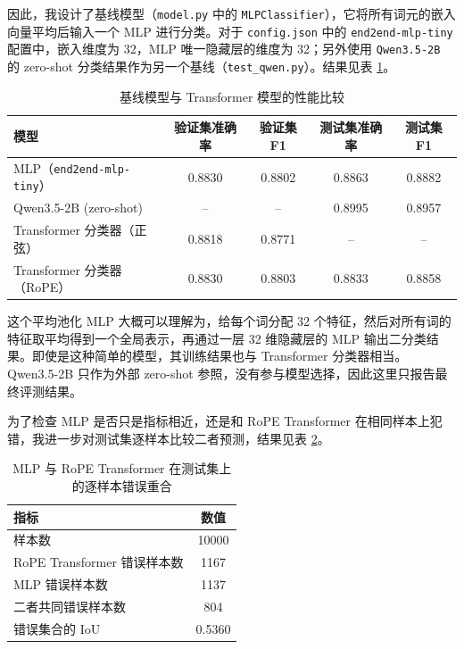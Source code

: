 \documentclass{ctexart}
\begin{document}
因此，我设计了基线模型（\verb|model.py| 中的 \verb|MLPClassifier|），它将所有词元的嵌入向量平均后输入一个 MLP 进行分类。对于 \verb|config.json| 中的 \verb|end2end-mlp-tiny| 配置中，嵌入维度为 32，MLP 唯一隐藏层的维度为 32；另外使用 \verb|Qwen3.5-2B| 的 zero-shot 分类结果作为另一个基线（\verb|test_qwen.py|）。结果见表 \ref{tab:baseline-results}。

\begin{table}[htbp]
    \centering
    \begin{tabular}{lcccc}
        \toprule
        模型 & 验证集准确率 & 验证集 F1 & 测试集准确率 & 测试集 F1 \\
        \midrule
        MLP（\verb|end2end-mlp-tiny|） & 0.8830 & 0.8802 & 0.8863 & 0.8882 \\
        Qwen3.5-2B (zero-shot) & -- & -- & 0.8995 & 0.8957 \\
        Transformer 分类器（正弦） & 0.8818 & 0.8771 & -- & -- \\
        Transformer 分类器（RoPE） & 0.8830 & 0.8803 & 0.8833 & 0.8858 \\
        \bottomrule
    \end{tabular}
    \caption{基线模型与 Transformer 模型的性能比较}
    \label{tab:baseline-results}
\end{table}

这个平均池化 MLP 大概可以理解为，给每个词分配 32 个特征，然后对所有词的特征取平均得到一个全局表示，再通过一层 32 维隐藏层的 MLP 输出二分类结果。即使是这种简单的模型，其训练结果也与 Transformer 分类器相当。
Qwen3.5-2B 只作为外部 zero-shot 参照，没有参与模型选择，因此这里只报告最终评测结果。

为了检查 MLP 是否只是指标相近，还是和 RoPE Transformer 在相同样本上犯错，我进一步对测试集逐样本比较二者预测，结果见表 \ref{tab:baseline-error-overlap}。

\begin{table}[htbp]
    \centering
    \begin{tabular}{lc}
        \toprule
        指标 & 数值 \\
        \midrule
        样本数 & 10000 \\
        RoPE Transformer 错误样本数 & 1167 \\
        MLP 错误样本数 & 1137 \\
        二者共同错误样本数 & 804 \\
        错误集合的 IoU & 0.5360 \\
        \bottomrule
    \end{tabular}
    \caption{MLP 与 RoPE Transformer 在测试集上的逐样本错误重合}
    \label{tab:baseline-error-overlap}
\end{table}
\end{document}

